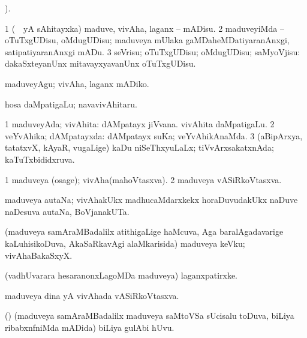 \bentry
{} 
\gl{\kirx}
).

\noindent
\gl{\sakirx}
\bmng
\bnum
\num{1} (\sA\ \aupa\ yA sAhitayxka) maduve, vivAha, laganx -- mADisu. 
\num{2} maduveyiMda -- oTuTxgUDisu, oMdugUDisu; maduveya mUlaka gaMDaheMDatiyaranAnxgi, satipatiyaranAnxgi mADu. 
\num{3} seVrisu; oTuTxgUDisu; oMdugUDisu; saMyoVjisu:  dakaSxteyanUnx mitavayxyavanUnx oTuTxgUDisu. 
\enum
\emng

 \noindent 
\gl{\akirx}
\expl{}
\bmng
maduveyAgu; vivAha, laganx mADiko. 
\emng

 \noindent 
\gl{\pagu}
\expl{}
\bmng
{} hosa daMpatigaLu; navavivAhitaru. 
\emng
\eentry

\bentry
{} 
\gl{\saMkiSx}
\expl{}
\bmng
{} 
\emng
\eentry

\bentry
{} 
\gl{\gu}
\expl{}
\bmng
\bnum
\num{1} maduveyAda; vivAhita:  dAMpatayx jiVvana.  vivAhita daMpatigaLu. 
\num{2} veYvAhika; dAMpatayxda:  dAMpatayx suKa; veYvAhikAnaMda. 
\num{3} (aBipArxya, tatatxvX, kAyaR, \mo vugaLige) kaDu niSeThxyuLaLx; tiVvArxsakatxnAda; kaTuTxbididxruva. 
\enum
\emng
\eentry

\bentry
{} 
\gl{\nA}
\expl{}
\bmng
\bnum
\num{1} maduveya (osage); vivAha(mahoVtasxva). 
\num{2} maduveya vASiRkoVtasxva. 
\enum
\emng
\eentry

\bentry
{}
\gl{\nA}
\bmng
maduveya autaNa; vivAhakUkx madhucaMdarxkekx horaDuvudakUkx naDuve naDesuva autaNa, BoVjanakUTa. 
\emng
\eentry

\bentry 
{} 
\gl{\nA}
\expl{}
\bmng
(maduveya samAraMBadalilx atithigaLige haMcuva, Aga baralAgadavarige kaLuhisikoDuva, AkaSaRkavAgi alaMkarisida) maduveya keVku; vivAhaBakaSxyX. 
\emng
\eentry

\bentry
{} 
\gl{\nA}
\expl{}
\bmng
(vadhUvarara hesaranonxLagoMDa maduveya) laganxpatirxke. 
\emng
\eentry

\bentry
{} 
\gl{\nA}
\expl{}
\bmng
maduveya dina yA vivAhada vASiRkoVtasxva. 
\emng
\eentry

\bentry
{} 
\gl{\nA}
\expl{}
\bmng
(\pArxparx) (maduveya samAraMBadalilx maduveya saMtoVSa sUcisalu toDuva, biLiya ribabxnfniMda mADida) biLiya gulAbi hUvu. 
\emng
\eentry

